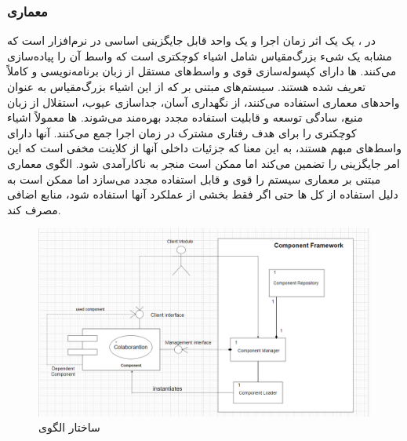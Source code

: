 \subsubsection{معماری }
\label{archCompBasedSec}
\begin{RTL}
در ،
یک  یک اثر زمان اجرا و یک واحد قابل
جایگزینی اساسی در نرم‌افزار است
که مشابه یک شیء بزرگ‌مقیاس شامل اشیاء کوچکتری است که واسط آن را
پیاده‌سازی می‌کنند. ها دارای کپسوله‌سازی قوی و
واسط‌های مستقل از زبان برنامه‌نویسی و کاملاً تعریف شده هستند.
سیستم‌های مبتنی بر 
که از این اشیاء بزرگ‌مقیاس به عنوان واحدهای معماری استفاده می‌کنند، از نگهداری
آسان، جداسازی عیوب، استقلال از زبان منبع، سادگی توسعه و قابلیت استفاده مجدد
بهره‌مند می‌شوند. ها معمولاً اشیاء کوچکتری را
برای هدف رفتاری مشترک در زمان اجرا جمع می‌کنند.
آنها دارای واسط‌های مبهم هستند، به این معنا که جزئیات
داخلی آنها از کلاینت مخفی است که این امر جایگزینی را تضمین می‌کند
اما ممکن است منجر به ناکارآمدی شود.
الگوی معماری مبتنی بر  \cite{ref4} معماری
سیستم را قوی و قابل استفاده مجدد می‌سازد اما ممکن است به دلیل
استفاده از کل ها حتی اگر فقط بخشی از عملکرد آنها
استفاده شود، منابع اضافی مصرف کند.
\end{RTL}
\begin{figure}[h!]
\centering
\includegraphics[scale=0.5]{images/first/component.png}
\caption{ساختار الگوی }
\end{figure}